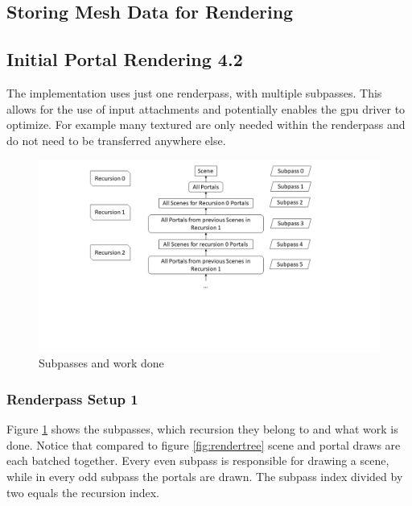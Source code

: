 \subsection{Storing Mesh Data for Rendering}

\subsection{Initial Portal Rendering 4.2}

The implementation uses just one renderpass, with multiple subpasses. This allows for the use of input attachments and potentially enables the \gls{gpu} driver to optimize. For example many textured are only needed within the renderpass and do not need to be transferred anywhere else.

\begin{figure}[h]
	\includegraphics[width=\linewidth]{images/renderpasses.png}
	\caption{Subpasses and work done}
	\label{fig:renderpasses}
\end{figure}

\subsubsection{Renderpass Setup 1}
\label{section:renderpass}

Figure \ref{fig:renderpasses} shows the subpasses, which recursion they belong to and what work is done. Notice that compared to figure \ref{fig:rendertree} scene and portal draws are each batched together. Every even subpass is responsible for drawing a scene, while in every odd subpass the portals are drawn. The subpass index divided by two equals the recursion index. 

